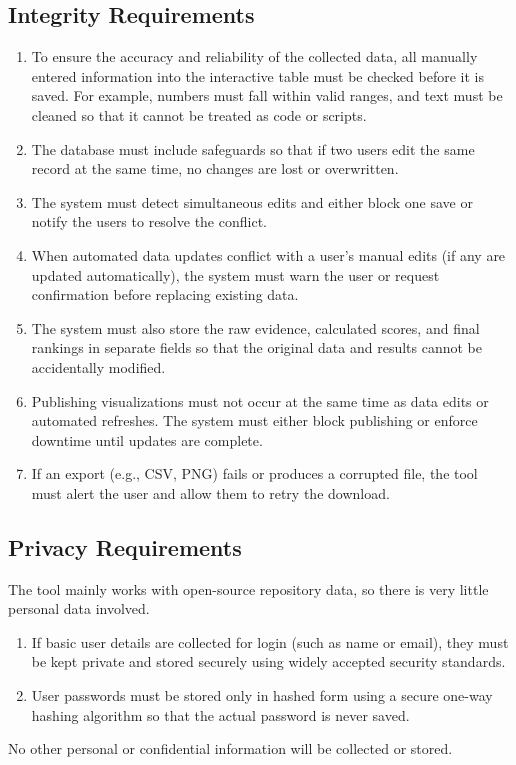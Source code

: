 \documentclass[12pt]{article}
\begin{document}
\subsection{Integrity Requirements}
\begin{enumerate}[label=SR-INT\arabic*]
\item To ensure the accuracy and reliability of the collected data, all manually entered information into the interactive table must be checked before it is saved. For example, numbers must fall within valid ranges, and text must be cleaned so that it cannot be treated as code or scripts.
\item The database must include safeguards so that if two users edit the same record at the same time, no changes are lost or overwritten.
\item The system must detect simultaneous edits and either block one save or notify the users to resolve the conflict.
\item When automated data updates conflict with a user’s manual edits (if any are updated automatically), the system must warn the user or request confirmation before replacing existing data.
\item The system must also store the raw evidence, calculated scores, and final rankings in separate fields so that the original data and results cannot be accidentally modified.
\item Publishing visualizations must not occur at the same time as data edits or automated refreshes. The system must either block publishing or enforce downtime until updates are complete.
\item If an export (e.g., CSV, PNG) fails or produces a corrupted file, the tool must alert the user and allow them to retry the download.
\end{enumerate}
\subsection{Privacy Requirements}
The tool mainly works with open-source repository data, so there is very little personal data involved.
\begin{enumerate}[label=SR-P\arabic*]
\item If basic user details are collected for login (such as name or email), they must be kept private and stored securely using widely accepted security standards.
\item User passwords must be stored only in hashed form using a secure one-way hashing algorithm so that the actual password is never saved.
\end{enumerate}
No other personal or confidential information will be collected or stored.
\end{document}
